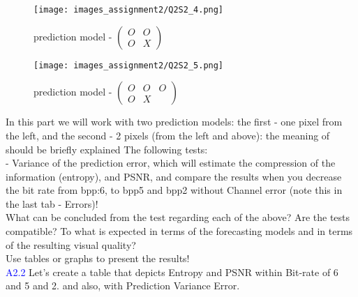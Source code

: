 \documentclass[letterpaper, 12pt]{article}
\begin{document}
\begin{figure}[htbp]
    \centering
    \texttt{[image: images\_assignment2/Q2S2\_4.png]}
    \caption{prediction model - $\begin{pmatrix}
O & O\\
O & X
\end{pmatrix}$ }
\end{figure}

\begin{figure}[htbp]
    \centering
    \texttt{[image: images\_assignment2/Q2S2\_5.png]}
    \caption{prediction model - $\begin{pmatrix}
O & O & O\\
O & X
\end{pmatrix}$}
\end{figure}
 In this part we will work with two prediction models: the first - one pixel from the left, and the second - 2 pixels (from the left and above): the meaning of should be briefly explained The following tests: \\
- Variance of the prediction error, which will estimate the compression of the information (entropy), and PSNR, and compare
the results when you decrease the bit rate from bpp:6, to bpp5 and bpp2 without
Channel error (note this in the last tab - Errors)! \\
What can be concluded from the test regarding each of the above? Are the tests compatible?
To what is expected in terms of the forecasting models and in terms of the resulting visual quality?\\
Use tables or graphs to present the results!\\
\textcolor{blue}{A2.2 } Let's create a table that depicts Entropy and PSNR within Bit-rate of 6 and 5 and 2. and also, with Prediction Variance Error. \\
\end{document}

